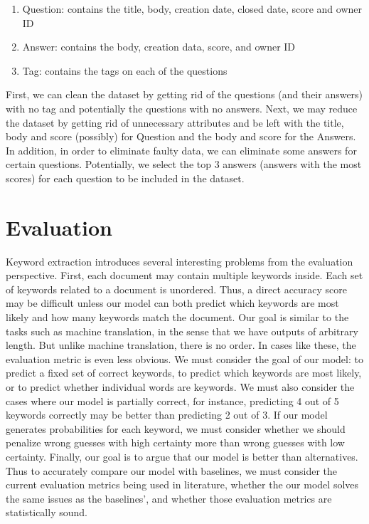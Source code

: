 \documentclass[sigconf,nonacm=True,10pt]{acmart}
\begin{document}
\begin{enumerate}
	\item Question: contains the title, body, creation date, closed date, score and owner ID
	\item Answer: contains the body, creation data, score, and owner ID 
	\item Tag: contains the tags on each of the questions
\end{enumerate}

First, we can clean the dataset by getting rid of the questions (and their answers) with no tag and potentially the questions with no answers. Next, we may reduce the dataset by getting rid of unnecessary attributes and be left with the title, body and score (possibly) for Question and the body and score for the Answers. In addition, in order to eliminate faulty data, we can eliminate some answers for certain questions. Potentially, we select the top 3 answers (answers with the most scores) for each question to be included in the dataset.

\section{Evaluation}
Keyword extraction introduces several interesting problems from the evaluation perspective. First, each document may contain multiple keywords inside. Each set of keywords related to a document is unordered. Thus, a direct accuracy score may be difficult unless our model can both predict which keywords are most likely and how many keywords match the document. Our goal is similar to the tasks such as machine translation, in the sense that we have outputs of arbitrary length. But unlike machine translation, there is no order. In cases like these, the evaluation metric is even less obvious. We must consider the goal of our model: to predict a fixed set of correct keywords, to predict which keywords are most likely, or to predict whether individual words are keywords. We must also consider the cases where our model is partially correct, for instance, predicting 4 out of 5 keywords correctly may be better than predicting 2 out of 3. If our model generates probabilities for each keyword, we must consider whether we should penalize wrong guesses with high certainty more than wrong guesses with low certainty. Finally, our goal is to argue that our model is better than alternatives. Thus to accurately compare our model with baselines, we must consider the current evaluation metrics being used in literature, whether the our model solves the same issues as the baselines', and whether those evaluation metrics are statistically sound.
\end{document}
